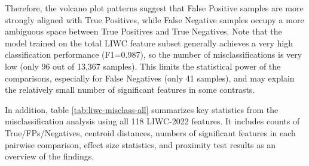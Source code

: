 Therefore, the volcano plot patterns suggest that False Positive samples are more strongly aligned with True Positives, while False Negative samples occupy a more ambiguous space between True Positives and True Negatives. Note that the model trained on the total LIWC feature subset generally achieves a very high classification performance (F1=0.987), so the number of misclassifications is very low (only 96 out of 13,367 samples). This limits the statistical power of the comparisons, especially for False Negatives (only 41 samples), and may explain the relatively small number of significant features in some contrasts.


In addition, table \ref{tab:liwc-misclass-all} summarizes key statistics from the misclassification analysis using all 118 LIWC-2022 features. It includes counts of True/FPs/Negatives, centroid distances, numbers of significant features in each pairwise comparison, effect size statistics, and proximity test results as an overview of the findings.


